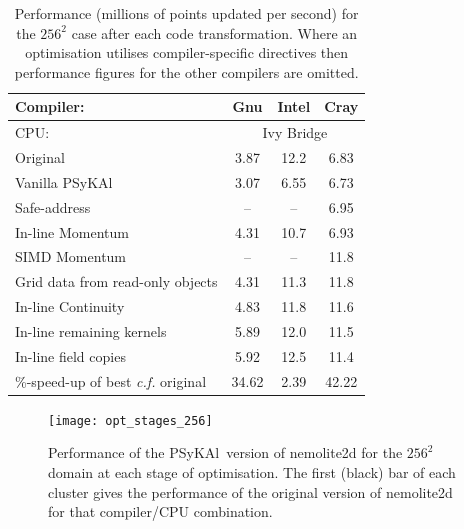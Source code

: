 \documentclass[journal]{IEEEtran}
\newcommand{\psykal}{{PS}y{KA}l\ }
\begin{document}
\begin{table}[!t]
\renewcommand{\arraystretch}{1.3}
\caption{Performance (millions of points updated per second) for the
  $256^2$ case after each code transformation. Where an optimisation
  utilises compiler-specific directives then performance figures for
  the other compilers are omitted.}
\label{TABLE_opt_breakdown}
\centering
\begin{tabular}{l|c|c|c}
\hline
Compiler:           & Gnu & Intel & Cray  \\
\hline
CPU:                & \multicolumn{3}{c}{Ivy Bridge}  \\
\hline
Original         & 3.87 & 12.2 & 6.83 \\
Vanilla \psykal  & 3.07 & 6.55 & 6.73 \\
Safe-address     & --   & --   & 6.95 \\
In-line Momentum & 4.31 & 10.7 & 6.93 \\
SIMD Momentum    & --   & --   & 11.8 \\
\parbox{2.5cm}{\raggedright Grid data from read-only objects} & 4.31 & 11.3 & 11.8 \\
In-line Continuity         & 4.83 & 11.8 & 11.6 \\
In-line remaining kernels  & 5.89 & 12.0 & 11.5 \\
In-line field copies       & 5.92 & 12.5 & 11.4 \\
\hline
\parbox{2.5cm}{\raggedright \%-speed-up of best {\it c.f.} original} & 34.62 & 2.39 & 42.22 \\
\hline
\end{tabular}
\end{table}

\begin{figure}[!t]
\centering
\texttt{[image: opt\_stages\_256]}
\caption{Performance of the \psykal version of nemolite2d for the
  $256^{2}$ domain at each stage of optimisation. The first (black)
  bar of each cluster gives the performance of the original version of
  nemolite2d for that compiler/CPU combination.}
\label{FIG_opt_stages_256}
\end{figure}

\end{document}
